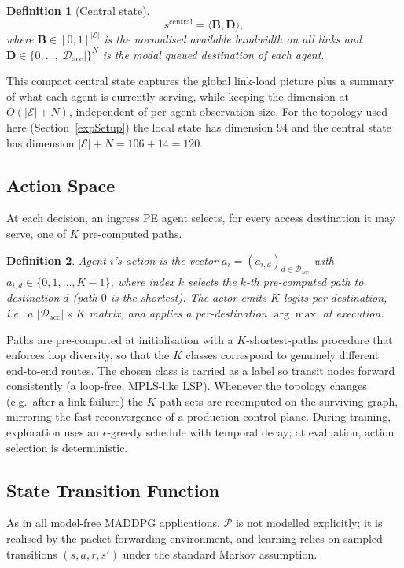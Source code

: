 \documentclass[10pt,journal,comsoc]{IEEEtran}
\newtheorem{definition}{Definition}
\begin{document}
\begin{definition}[Central state]
  \label{central_state}
  \[
    s^{\text{central}} = \langle \mathbf{B}, \mathbf{D} \rangle,
  \]
  where $\mathbf{B} \in [0,1]^{|\mathcal{E}|}$ is the normalised available bandwidth on all links and $\mathbf{D} \in \{0,\dots,|\mathcal{D}_{\text{acc}}|\}^{N}$ is the modal queued destination of each agent.
\end{definition}

This compact central state captures the global link-load picture plus a summary of what each agent is currently serving, while keeping the dimension at $O(|\mathcal{E}| + N)$, independent of per-agent observation size. For the topology used here (Section~\ref{expSetup}) the local state has dimension $94$ and the central state has dimension $|\mathcal{E}| + N = 106 + 14 = 120$.

\subsection{Action Space}
At each decision, an ingress PE agent selects, for every access destination it may serve, one of $K$ pre-computed paths.

\begin{definition}
  \label{def:action_space}
  Agent $i$'s action is the vector $a_i = (a_{i,d})_{d \in \mathcal{D}_{\text{acc}}}$ with $a_{i,d} \in \{0,1,\dots,K-1\}$, where index $k$ selects the $k$-th pre-computed path to destination $d$ (path $0$ is the shortest). The actor emits $K$ logits per destination, i.e.\ a $|\mathcal{D}_{\text{acc}}|\times K$ matrix, and applies a per-destination $\arg\max$ at execution.
\end{definition}

Paths are pre-computed at initialisation with a $K$-shortest-paths procedure that enforces hop diversity, so that the $K$ classes correspond to genuinely different end-to-end routes. The chosen class is carried as a label so transit nodes forward consistently (a loop-free, MPLS-like LSP). Whenever the topology changes (e.g.\ after a link failure) the $K$-path sets are recomputed on the surviving graph, mirroring the fast reconvergence of a production control plane. During training, exploration uses an $\epsilon$-greedy schedule with temporal decay; at evaluation, action selection is deterministic.

\subsection{State Transition Function}
As in all model-free MADDPG applications, $\mathcal{P}$ is not modelled explicitly; it is realised by the packet-forwarding environment, and learning relies on sampled transitions $(s,a,r,s')$ under the standard Markov assumption.
\end{document}
